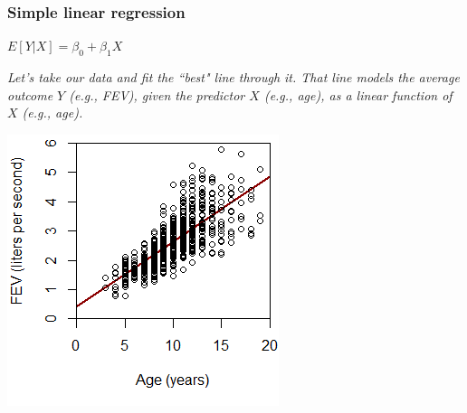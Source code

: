 \documentclass[12pt, 
hyperref={colorlinks=true, linkcolor=blue, urlcolor=cyan}]{beamer}
\begin{document}
\begin{frame}
\frametitle{Simple linear regression}

\begin{center} 
 \color{red} $E[Y|X] = \beta_0 + \beta_1 X$ \color{black}
\end{center} \vspace{-0.3cm}

\begin{small} \textit{Let's take our data and fit the ``best" line through it. That line models the average outcome $Y$ (e.g., FEV), given the predictor $X$ (e.g., age), as a linear function of $X$ (e.g., age).} \end{small}

\center
\vspace{-0.3cm} \center \includegraphics[height=0.65\textheight]{./plots/plot_fev_vs_age}

\end{frame}

\end{document}
